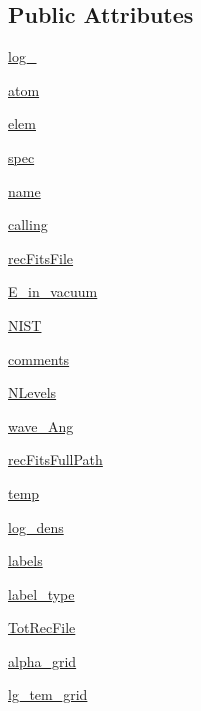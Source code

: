 \subsection*{Public Attributes}
\begin{DoxyCompactItemize}
\item 
\hyperlink{classpyneb_1_1core_1_1pynebcore_1_1_rec_atom_afd87151907f32bc0dc45f0171b61374e}{log\-\_\-}
\item 
\hyperlink{classpyneb_1_1core_1_1pynebcore_1_1_rec_atom_a0c5c7091b1d8a95d9bee2744d713f5c9}{atom}
\item 
\hyperlink{classpyneb_1_1core_1_1pynebcore_1_1_rec_atom_a62e73dc66c7aff7941c5ce94e808c23a}{elem}
\item 
\hyperlink{classpyneb_1_1core_1_1pynebcore_1_1_rec_atom_adaf1b66faf18504ec4b5c8c0b7f6763b}{spec}
\item 
\hyperlink{classpyneb_1_1core_1_1pynebcore_1_1_rec_atom_ab74e6bf80237ddc4109968cedc58c151}{name}
\item 
\hyperlink{classpyneb_1_1core_1_1pynebcore_1_1_rec_atom_ab25fa7ebe84b603684dee62410c1e34c}{calling}
\item 
\hyperlink{classpyneb_1_1core_1_1pynebcore_1_1_rec_atom_a92b0b9192dc7e089ec88ea759e511ebf}{rec\-Fits\-File}
\item 
\hyperlink{classpyneb_1_1core_1_1pynebcore_1_1_rec_atom_a9ebe0987aa5ded08c781ed3b5feb4d8a}{E\-\_\-in\-\_\-vacuum}
\item 
\hyperlink{classpyneb_1_1core_1_1pynebcore_1_1_rec_atom_a6d03226c81aa049b486e97a3462a794b}{N\-I\-S\-T}
\item 
\hyperlink{classpyneb_1_1core_1_1pynebcore_1_1_rec_atom_a64b8b36116751d566275b722e40bb3a7}{comments}
\item 
\hyperlink{classpyneb_1_1core_1_1pynebcore_1_1_rec_atom_a4d45fe163c2108853ab418386bf4da56}{N\-Levels}
\item 
\hyperlink{classpyneb_1_1core_1_1pynebcore_1_1_rec_atom_ab5130f33e76a12670614a4ecf47211b0}{wave\-\_\-\-Ang}
\item 
\hyperlink{classpyneb_1_1core_1_1pynebcore_1_1_rec_atom_ae146a26262d042f38fe497eb84e306af}{rec\-Fits\-Full\-Path}
\item 
\hyperlink{classpyneb_1_1core_1_1pynebcore_1_1_rec_atom_a905c521e05ec8042631a912b71d0454e}{temp}
\item 
\hyperlink{classpyneb_1_1core_1_1pynebcore_1_1_rec_atom_ad3a3ac99b890919687b848cfe0cb9fc0}{log\-\_\-dens}
\item 
\hyperlink{classpyneb_1_1core_1_1pynebcore_1_1_rec_atom_abc325fc13d4194905c1786e24ee447f0}{labels}
\item 
\hyperlink{classpyneb_1_1core_1_1pynebcore_1_1_rec_atom_a27a2d3d0fcd201122f8c13d604f91e38}{label\-\_\-type}
\item 
\hyperlink{classpyneb_1_1core_1_1pynebcore_1_1_rec_atom_a0fcbd7a04dbc3f296dd07465a41140bb}{Tot\-Rec\-File}
\item 
\hyperlink{classpyneb_1_1core_1_1pynebcore_1_1_rec_atom_aafd239b8375c7cfbdb8ed3bc8fc339d1}{alpha\-\_\-grid}
\item 
\hyperlink{classpyneb_1_1core_1_1pynebcore_1_1_rec_atom_a4c3755d724064b6fd92d0bdbd09b63a8}{lg\-\_\-tem\-\_\-grid}
\end{DoxyCompactItemize}


